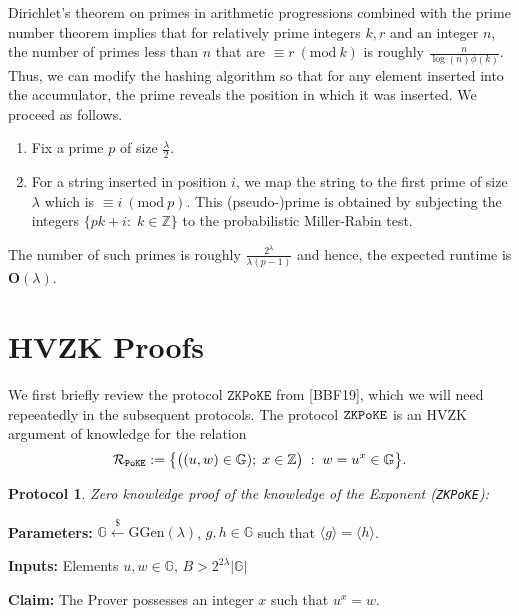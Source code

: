 \documentclass[11pt, lettersize, notitlepage, leqno, footskip=0.6cm]{article}
\newcommand{\bz}{\mathbb Z}
\newcommand{\ttt}{\texttt}
\newcommand{\bG}{\mathbb{G}}
\newcommand{\la}{\langle}
\newcommand{\ra}{\rangle}
\newcommand{\mc}{\mathcal}
\newcommand{\mb}{\mathbb}
\newcommand{\mbf}{\mathbf}
\newcommand{\mr}{\mathrm}
\newcommand{\lam}{\lambda}
\newcommand{\lamb}{\lambda}
\newcommand{\vs}{\vspace{-0.15cm}}
\newcommand{\noin}{\noindent}
\newcommand{\Mod}[1]{\ (\mathrm{mod}\ #1)}
\newtheorem{Prot}[Thm]{Protocol}
\numberwithin{equation}{section}
\begin{document}
Dirichlet's theorem on primes in arithmetic progressions combined with the prime number theorem implies that for relatively prime integers $k,r$ and an integer $n$, the number of primes less than $n$ that are $\equiv r\Mod{k}$ is roughly $\frac{n}{\log(n)\phi(k)}$. Thus, we can modify the hashing algorithm so that for any element inserted into the accumulator, the prime reveals the position in which it was inserted. We proceed as follows.\begin{enumerate}[wide, labelwidth=!, labelindent=0pt]\vspace{-0.1cm} 

\item Fix a prime $p$ of size $\frac{\lam}{2}$. \vs 

\item For a string inserted in position $i$, we map the string to the first prime of size $\lam$ which is $\equiv i\Mod{p}$. This (pseudo-)prime is obtained by subjecting the integers $\{pk+i:\;k\in\bz\}$ to the probabilistic Miller-Rabin test. \end{enumerate} 

\noin The number of such primes is roughly \vs $\frac{2^{\lam}}{\lam (p-1)}$ and hence, the expected runtime is $\mbf{O}(\lam)$.

\section{\fontsize{11}{11}\selectfont HVZK Proofs}

We first briefly review the protocol $\ttt{ZKPoKE}$ from [BBF19], which we will need repeeatedly in the subsequent protocols. The protocol $\tt{ZKPoKE}$ is an HVZK argument of knowledge for the relation \vs $$\mc{R}_{\tt{PoKE}}:= \big\{\big((u,w)\in \bG);\; x\in \bz\big)\;:\; w = u^x \in \bG  \big\}.$$

\begin{Prot} \normalfont \hypertarget{ZKPoKE}{\textit{Zero knowledge proof of the knowledge of the Exponent}} (\verb|ZKPoKE|):\end{Prot} \vspace{-0.3cm}

\noin \textbf{Parameters:} $\mb{G}\xleftarrow{\$} \mr{GGen}(\lamb)$,  $g,h\in \mb{G}$ such that $\la g \ra = \la h \ra$.

\noin \textbf{Inputs:} Elements $u,w \in \mb{G}$, $B > 2^{2\lam}|\bG|$

\noin \textbf{Claim:} The Prover possesses an integer $x$ such that $u^x = w$.
\end{document}
